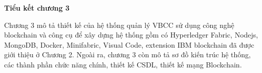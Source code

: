 \begin{enumerate}
    
\end{enumerate}

\textbf{Tiểu kết chương 3}

Chương 3 mô tả thiết kế của hệ thống quản lý VBCC sử dụng công nghệ blockchain và công cụ để xây dựng hệ thống gồm có Hyperledger Fabric, Nodejs, MongoDB, Docker, Minifabric, Visual Code, extension IBM blockchain đã được giới thiệu ở Chương 2. Ngoài ra, chương 3 còn mô tả sơ đồ kiến trúc hệ thống, các thành phần chức năng chính, thiết kế CSDL, thiết kế mạng Blockchain. 

